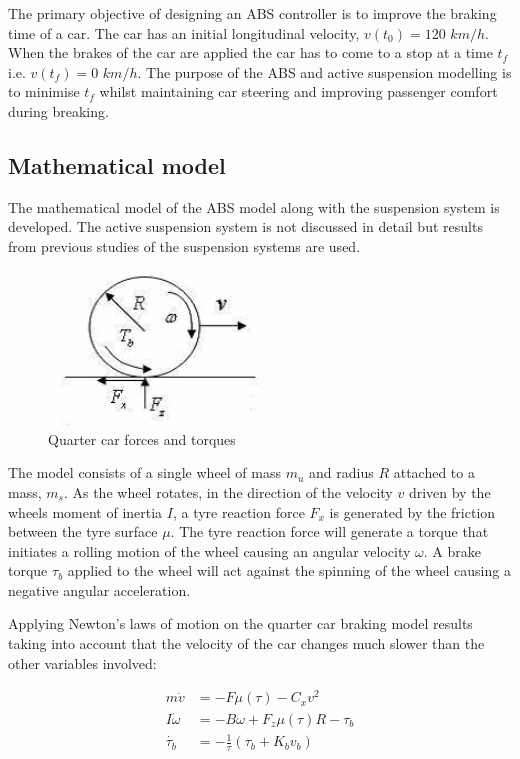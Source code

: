 \documentclass[10pt,twocolumn]{witseiepaper}
\begin{document}
The primary objective of designing an ABS controller is to improve the braking time of a car. The car has an initial longitudinal velocity, $v(t_0) = 120$ $km/h $. When the brakes of the car are applied the car has to come to a stop at a time $t_{f}$ i.e. $v(t_f) = 0$ $km/h$. The purpose of the ABS and active suspension modelling is to minimise $t_f$ whilst maintaining car steering and improving passenger comfort during breaking.

\subsection{Mathematical model}

The mathematical model of the ABS model along with the suspension system is developed. The active suspension system is not discussed in detail but results from previous studies of the suspension systems are used. 

\begin{figure}[ht!]
	\centering
		\includegraphics[width=0.50\textwidth]{Quarter_car.png}
	\caption{Quarter car forces and torques \cite{Shaomin:2010}}
	\label{fig:system}
\end{figure}

The model consists of a single wheel of mass $m_u$ and radius $R$ attached to a mass, $m_s$. As the wheel rotates, in the direction of the velocity $v$ driven by the wheels moment of inertia $I$, a tyre reaction force $F_x$ is generated by the friction between the tyre surface $\mu$. The tyre reaction force will generate a torque that initiates a rolling motion of the wheel causing an angular velocity $\omega$. A brake torque $\tau_b$ applied to the wheel will act against the spinning of the wheel causing a negative angular acceleration.

Applying Newton's laws of motion on the quarter car braking model results taking into account that the velocity of the car changes much slower than the other variables involved:

\begin{equation}
	\begin{align}
		m \dot{v} &= -F \mu (\tau)- C_x v^2 \\
		I \dot{\omega} &= -B \omega + F_z \mu (\tau) R - \tau_b \\
		\dot{\tau _b} &= - \frac{1}{\tau}(\tau _b + K_bv_b)
	\end{align}
	\label{eqn:forces}
\end{equation}
\end{document}

